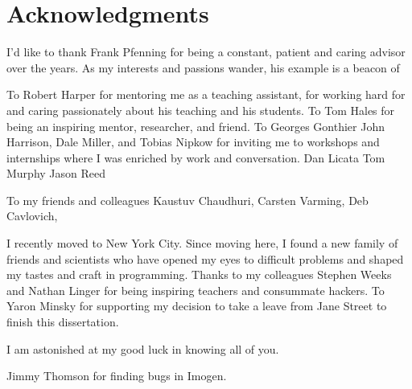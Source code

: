 \chapter*{Acknowledgments}

I'd like to thank Frank Pfenning for being a constant, patient and caring
advisor over the years.  As my interests and passions wander, his example
is a beacon of

To Robert Harper for mentoring me as a teaching
assistant, for working hard for and caring passionately about his teaching and
his students.  To Tom Hales for being an inspiring mentor, researcher, and
friend.  To Georges Gonthier
John Harrison, Dale Miller, and Tobias Nipkow for
inviting me to workshops and internships where I was enriched by work and
conversation.
Dan Licata
Tom Murphy
Jason Reed

To my friends and colleagues Kaustuv Chaudhuri, Carsten Varming,
Deb Cavlovich,

I recently moved to New York City.  Since moving here, I found a new family of
friends and scientists who have opened my eyes to difficult problems and shaped
my tastes and craft in programming.  Thanks to my colleagues Stephen Weeks and
Nathan Linger for being inspiring teachers and consummate hackers.  To Yaron
Minsky for supporting my decision to take a leave from Jane Street to finish
this dissertation.

I am astonished at my good luck in knowing all of you.

Jimmy Thomson for finding bugs in Imogen.


